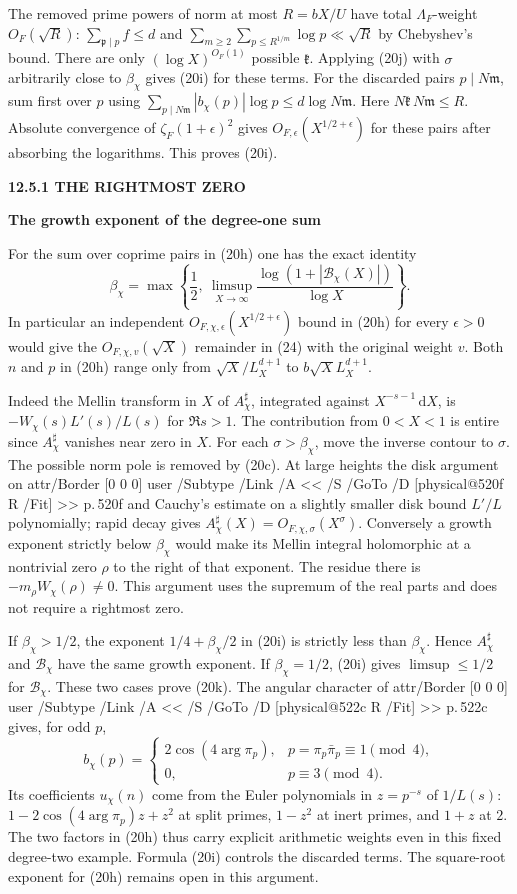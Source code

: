 \documentclass[11pt,letterpaper]{article}
\makeatletter
\newcommand{\rightmarktext}{}
\newcommand{\printfolio}{}
\newcommand{\leaf}[4]{\clearpage\gdef\printfolio{#1}\gdef\rightmarktext{#2}%
  {\small\sffamily\bfseries\color{ink}#3\par}\vspace{3pt}%
  {\LARGE\bfseries #4\par}\vspace{5pt}}
\newcommand{\dd}{\,\mathrm d}
\newcommand{\MusicPDFPageRef}[1]{\pdfpageref\csname physical@#1\endcsname\space\space 0 R}
\newcommand{\pagelink}[2]{\leavevmode\pdfstartlink attr{/Border [0 0 0]} user{%
  /Subtype /Link /A << /S /GoTo /D [\MusicPDFPageRef{#1} /Fit] >>}%
  {\color{ink}#2}\pdfendlink}
\newcommand{\pg}[1]{\pagelink{#1}{p.\,#1}}
\makeatother
\begin{document}
The removed prime powers of norm at most $R=bX/U$ have total
$\Lambda_F$-weight $O_F(\sqrt R)$: $\sum_{\mathfrak p\mid p}f\le d$
and $\sum_{m\ge2}\sum_{p\le R^{1/m}}\log p\ll\sqrt R$ by Chebyshev's
bound. There are only $(\log X)^{O_F(1)}$ possible $\mathfrak k$.
Applying (20j) with $\sigma$ arbitrarily close to $\beta_\chi$ gives
(20i) for these terms. For the discarded pairs $p\mid N\mathfrak m$,
sum first over $p$ using $\sum_{p\mid N\mathfrak m}|b_\chi(p)|\log p
\le d\log N\mathfrak m$. Here $N\mathfrak k\,N\mathfrak m\le R$.
Absolute convergence of $\zeta_F(1+\epsilon)^2$ gives
$O_{F,\epsilon}(X^{1/2+\epsilon})$ for these pairs after absorbing
the logarithms. This proves (20i).

\leaf{520g}{Growth of the prime sum}{12.5.1 \quad THE RIGHTMOST ZERO}{The growth exponent of the degree-one sum}
For the sum over coprime pairs in (20h) one has the exact identity
\[
 \boxed{\displaystyle
  \beta_\chi=
   \max\left\{\frac12,\ \limsup_{X\to\infty}
                \frac{\log(1+|\mathcal B_\chi(X)|)}{\log X}\right\}.}
 \tag{20k}
\]
In particular an independent $O_{F,\chi,\epsilon}(X^{1/2+\epsilon})$
bound in (20h) for every $\epsilon>0$ would give the
$O_{F,\chi,v}(\sqrt X)$ remainder in (24) with the original weight
$v$. Both $n$ and $p$ in (20h) range only from $\sqrt X/L_X^{d+1}$
to $b\sqrt X L_X^{d+1}$.

Indeed the Mellin transform in $X$ of $A^\sharp_\chi$, integrated
against $X^{-s-1}\dd X$, is $-W_\chi(s)L'(s)/L(s)$ for $\Re s>1$.
The contribution from $0<X<1$ is entire since $A^\sharp_\chi$ vanishes
near zero in $X$. For each $\sigma>\beta_\chi$, move the inverse contour
to $\sigma$. The possible norm pole is removed by (20c). At large
heights the disk argument on \pg{520f} and Cauchy's estimate on a
slightly smaller disk bound $L'/L$ polynomially; rapid decay gives
$A^\sharp_\chi(X)=O_{F,\chi,\sigma}(X^\sigma)$. Conversely a growth
exponent strictly below $\beta_\chi$ would make its Mellin integral
holomorphic at a nontrivial zero $\rho$ to the right of that exponent.
The residue there is $-m_\rho W_\chi(\rho)\ne0$. This argument uses
the supremum of the real parts and does not require a rightmost zero.

If $\beta_\chi>1/2$, the exponent $1/4+\beta_\chi/2$ in (20i) is
strictly less than $\beta_\chi$. Hence $A^\sharp_\chi$ and
$\mathcal B_\chi$ have the same growth exponent. If $\beta_\chi=1/2$,
(20i) gives $\limsup\le1/2$ for $\mathcal B_\chi$. These two cases
prove (20k). The angular character of \pg{522c} gives, for odd $p$,
\[
 b_\chi(p)=
  \begin{cases}2\cos(4\arg\pi_p),&p=\pi_p\bar\pi_p\equiv1\pmod4,\\
                0,&p\equiv3\pmod4.
  \end{cases}
\]
Its coefficients $u_\chi(n)$ come from the Euler polynomials in
$z=p^{-s}$ of $1/L(s)$: $1-2\cos(4\arg\pi_p)z+z^2$ at split primes,
$1-z^2$ at inert primes, and $1+z$ at $2$.
The two factors in (20h) thus carry explicit arithmetic weights even
in this fixed degree-two example. Formula (20i) controls the discarded
terms. The square-root exponent for (20h) remains open in this argument.
\end{document}
